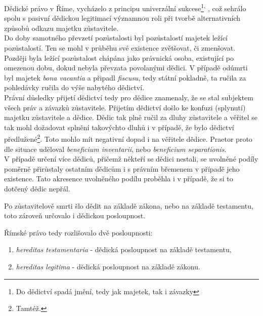 \documentclass{article}
\begin{document}
Dědické právo v Říme, vycházelo z principu univerzální sukcese\footnote{Do dědictví spadá jmění, tedy jak majetek, tak i závazky}\textsuperscript{,} , což sehrálo spolu s pasivní dědickou legitimací významnou roli při tvorbě alternativních způsobů odkazu majetku zůstavitele. \\

Do doby samotného převzetí pozůstalosti byl pozůstalostí majetek ležící pozůstalostí. Ten se mohl v průběhu své existence zvětšovat, či zmenšovat. Později byla ležící pozůstalost chápána jako právnická osoba, existující po omezenou dobu, dokud nebyla převzata povolanými dědici. V případě odúmrti byl majetek \textit{bona vacantia} a připadl \textit{fiscusu}, tedy státní pokladně, ta ručila za pohledávky ručila do výše nabytého dědictví.\\

Právní důsledky přijetí dědictví tedy pro dědice znamenaly, že se stal subjektem všech práv a závazků zůstavitele. Přijetím dědictví došlo ke konfuzi (splynutí) majetku zůstavitele a dědice. Dědic tak plně ručil za dluhy zůstavitele a věřitel se tak mohl dožadovat splnění takovýchto dluhů i v případě, že bylo dědictví předlužené\footnote{Tamtéž.}. Toto mohlo mít negativní dopad i na věřitele dědice. Praetor proto dle situace uděloval \textit{beneficium inventarii}, nebo \textit{beneficium separationis}.\\

V případě určení více dědiců, přičemž někteří se dědici nestali, se uvolněné podíly poměrně přirůstaly ostatním dědicům i s právním břemenem v případě jeho existence. Tato akresence uvolněného podílu proběhla i v případě, že si to dotčený dědic nepřál.


Po zůstavitelově smrti šlo dědit na základě zákona, nebo na základě testamentu, toto zároveň určovalo i dědickou posloupnost. \\

\vspace{5 mm}

Římské právo tedy rozlišovalo dvě posloupnosti:
\begin{enumerate}
\item \textit{hereditas testamentaria} - dědická posloupnost na základě testamentu,
\item \textit{hereditas legitima} - dědická posloupnost na základě zákonu.
\end{enumerate}
\end{document}
